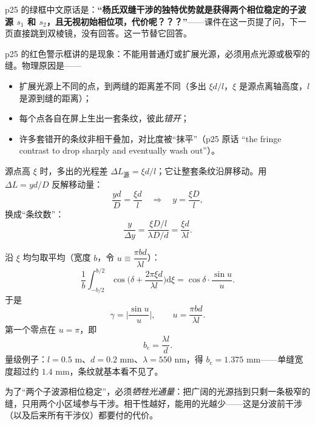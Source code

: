 \documentclass[11pt]{ctexart}
\begin{document}
\flowerrule

p25 的绿框中文原话是：\textbf{“杨氏双缝干涉的独特优势就是获得两个相位稳定的子波源 $s_1$ 和 $s_2$，且无视初始相位项，代价呢？？？”}——课件在这一页提了问，下一页直接跳到双棱镜，没有回答。这一节替它回答。


p25 的红色警示框讲的是现象：不能用普通灯或扩展光源，必须用点光源或极窄的缝。物理原因是——
\begin{itemize}
\item 扩展光源上不同的点，到两缝的距离差不同（多出 $\xi d/l$，$\xi$ 是源点离轴高度，$l$ 是源到缝的距离）；
\item 每个点各自在屏上生出一套条纹，彼此\emph{错开}；
\item 许多套错开的条纹非相干叠加，对比度被“抹平”（p25 原话 “the fringe contrast to drop sharply and eventually wash out”）。
\end{itemize}


源点高 $\xi$ 时，多出的光程差 $\Delta L_{\text{源}}=\xi d/l$；它让整套条纹沿屏移动。用 $\Delta L=yd/D$ 反解移动量：
\[
\frac{yd}{D}=\frac{\xi d}{l}\quad\Longrightarrow\quad y=\frac{\xi D}{l},
\]
换成“条纹数”：
\[
\frac{y}{\Delta y}=\frac{\xi D/l}{\lambda D/d}=\frac{\xi d}{\lambda l}.
\]


沿 $\xi$ 均匀取平均（宽度 $b$，令 $u\equiv\dfrac{\pi b d}{\lambda l}$）：
\[
\frac1b\int_{-b/2}^{b/2}\cos\Big(\delta+\frac{2\pi\xi d}{\lambda l}\Big)\mathrm{d}\xi
=\cos\delta\cdot\frac{\sin u}{u}.
\]
于是
\[
\gamma=\Big|\frac{\sin u}{u}\Big|,\qquad u=\frac{\pi b d}{\lambda l}.
\]
第一个零点在 $u=\pi$，即
\[
b_{\text{c}}=\frac{\lambda l}{d}.
\]
量级例子：$l=0.5$ m、$d=0.2$ mm、$\lambda=550$ nm，得 $b_{\text{c}}=1.375$ mm——单缝宽度超过约 $1.4$ mm，条纹就基本看不见了。


为了“两个子波源相位稳定”，必须\emph{牺牲光通量}：把广阔的光源挡到只剩一条极窄的缝，只用两个小区域参与干涉。相干性越好，能用的光越少——这是分波前干涉（以及后来所有干涉仪）都要付的代价。

\flowerrule
\end{document}
